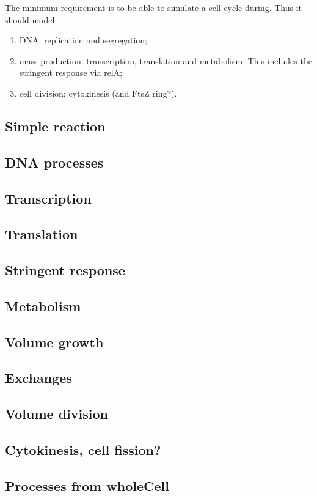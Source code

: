 The minimum requirement is to be able to simulate a cell cycle during. Thus it should model
\begin{enumerate}
  \item DNA: replication and segregation;
  \item mass production: transcription, translation and metabolism. This includes the stringent response via relA;
  \item cell division: cytokinesis (and FtsZ ring?).
\end{enumerate}



\subsection{Simple reaction}


\subsection{DNA processes}


\subsection{Transcription}


\subsection{Translation}


\subsection{Stringent response}


\subsection{Metabolism}


\subsection{Volume growth}


\subsection{Exchanges}


\subsection{Volume division}


\subsection{Cytokinesis, cell fission?}


\subsection{Processes from wholeCell}

